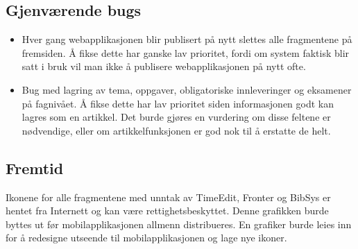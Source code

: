 \documentclass[../main.tex]{subfiles}
\begin{document}
\subsection{Gjenværende bugs}

\begin{itemize}
\item Hver gang webapplikasjonen blir publisert på nytt slettes alle fragmentene på fremsiden. Å fikse dette har ganske lav prioritet, fordi om system faktisk blir satt i bruk vil man ikke å publisere webapplikasjonen på nytt ofte.
\item Bug med lagring av tema, oppgaver, obligatoriske innleveringer og eksamener på fagnivået. Å fikse dette har lav prioritet siden informasjonen godt kan lagres som en artikkel. Det burde gjøres en vurdering om disse feltene er nødvendige, eller om artikkelfunksjonen er god nok til å erstatte de helt.
\end{itemize}

\subsection{Fremtid}

Ikonene for alle fragmentene med unntak av TimeEdit, Fronter og BibSys er hentet fra Internett og kan være rettighetsbeskyttet. Denne grafikken burde byttes ut før mobilapplikasjonen allmenn distribueres. En grafiker burde leies inn for å redesigne utseende til mobilapplikasjonen og lage nye ikoner.

\newpage
\end{document}
